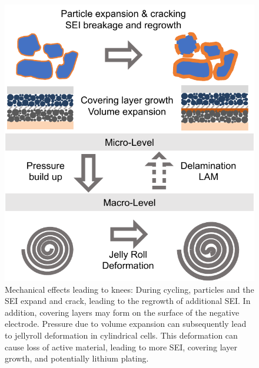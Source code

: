 \documentclass[journal=jpclcd,manuscript=article]{achemso}
\begin{document}
\begin{figure}
\centering
\includegraphics[scale = 1]{figures/MechanicalKneepoints.pdf}
\caption{Mechanical effects leading to knees: During cycling, particles and the SEI expand and crack, leading to the regrowth of additional SEI. In addition, covering layers may form on the surface of the negative electrode. Pressure due to volume expansion can subsequently lead to jellyroll deformation in cylindrical cells. This deformation can cause loss of active material, leading to more SEI, covering layer growth, and potentially lithium plating.}
\label{fig:knee_mechanical}
\end{figure}
\end{document}
